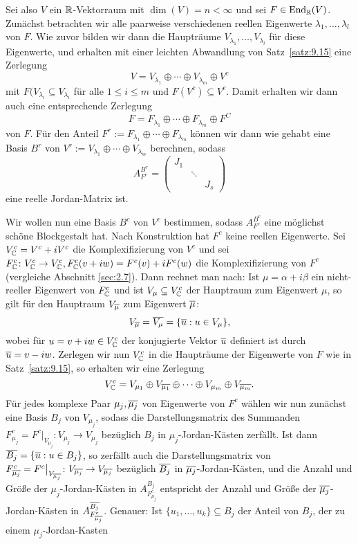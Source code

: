 Sei also $V$ ein $\mathbb{R}$-Vektorraum mit $\dim(V) = n < \infty$ und sei $F \in \operatorname{End}_{\mathbb{R}}(V)$.
Zunächst betrachten wir alle paarweise verschiedenen reellen Eigenwerte $\lambda_1,\dots,\lambda_l$ von $F$.
Wie zuvor bilden wir dann die Haupträume $V_{\lambda_1},\dots,V_{\lambda_l}$ für diese Eigenwerte, und erhalten mit einer leichten Abwandlung von Satz~\ref{satz:9.15} eine Zerlegung
\[
	V = V_{\lambda_1} \oplus \cdots \oplus V_{\lambda_m} \oplus V^c
\]
mit $F(V_{\lambda_i} \subseteq V_{\lambda_i}$ für alle $1 \leq i \leq m$ und $F(V^c) \subseteq V^c$.
Damit erhalten wir dann auch eine entsprechende Zerlegung
\[
	F = F_{\lambda_1} \oplus \cdots \oplus F_{\lambda_m} \oplus F^C
\]
von $F$.
Für den Anteil $F^r := F_{\lambda_1} \oplus \cdots \oplus F_{\lambda_m}$ können wir dann wie gehabt eine Basis $B^r$ von $V^r := V_{\lambda_1} \oplus \cdots \oplus V_{\lambda_m}$ berechnen, sodass
\[
	A_{F^r}^{B^r} = \begin{pmatrix}
		J_1 &        &  \\
		    & \ddots &  \\
		    &        & J_s
	\end{pmatrix}
\]
eine reelle Jordan-Matrix ist.

Wir wollen nun eine Basis $B^c$ von $V^c$ bestimmen, sodass $A_{F^c}^{B^c}$ eine möglichst schöne Blockgestalt hat.
Nach Konstruktion hat $F^c$ keine reellen Eigenwerte.
Sei $V_{\mathbb{C}}^c = V^c + iV^c$ die Komplexifizierung von $V^c$ und sei $F_{\mathbb{C}}^c \colon V_{\mathbb{C}}^c \rightarrow V_{\mathbb{C}}^c, F_{\mathbb{C}}^c(v+iw) = F^c(v) + iF^c(w)$ die Komplexifizierung von $F^c$ (vergleiche Abschnitt \ref{sec:2.7}).
Dann rechnet man nach:
Ist $\mu = \alpha + i \beta$ ein nicht-reeller Eigenwert von $F_{\mathbb{C}}^c$ und ist $V_\mu \subseteq V_{\mathbb{C}}^c$ der Hauptraum zum Eigenwert $\mu$, so gilt für den Hauptraum $V_{\overline{\mu}}$ zum Eigenwert $\overline{\mu}$:
\[
	V_{\overline{\mu}} = \overline{V_\mu} = \{ \overline{u} : u \in V_{\mu}\},
\]
wobei für $u = v + iw \in V_{\mathbb{C}}^c$ der konjugierte Vektor $\overline{u}$ definiert ist durch $\overline{u} = v-iw$.
Zerlegen wir nun $V_{\mathbb{C}}^c$ in die Haupträume der Eigenwerte von $F$ wie in Satz~\ref{satz:9.15}, so erhalten wir eine Zerlegung
\[
	V_{\mathbb{C}}^c = V_{\mu_1} \oplus V_{\overline{\mu_1}} \oplus \cdots \oplus V_{\mu_m} \oplus V_{\overline{\mu_m}}.
\]
Für jedes komplexe Paar $\mu_j, \overline{\mu_j}$ von Eigenwerte von $F^c$ wählen wir nun zunächst eine Basis $B_j$ von $V_{\mu_j}$, sodass die Darstellungsmatrix des Summanden $F_{\mu_j}^c = F^c \big|_{V_{\mu_j}} \colon V_{\mu_j} \rightarrow V_{\mu_j}$ bezüglich $B_j$ in $\mu_j$-Jordan-Kästen zerfällt.
Ist dann $\overline{B_j} = \{\overline{u} : u \in B_j\}$, so zerfällt auch die Darstellungsmatrix von $F^c_{\overline{\mu_j}} = F^c \big|_{V_{\overline{\mu_j}}} \colon V_{\overline{\mu_j}} \rightarrow V_{\overline{\mu_j}}$ bezüglich $\overline{B_j}$ in $\overline{\mu_j}$-Jordan-Kästen, und die Anzahl und Größe der $\mu_j$-Jordan-Kästen in $A_{F_{\mu_j}^c}^{B_j}$ entspricht der Anzahl und Größe der $\overline{\mu_j}$-Jordan-Kästen in $A_{F_{\overline{\mu_j}}^c}^{\overline{B_j}}$.
Genauer: Ist $\{u_1,\dots,u_k\} \subseteq B_j$ der Anteil von $B_j$, der zu einem $\mu_j$-Jordan-Kasten


